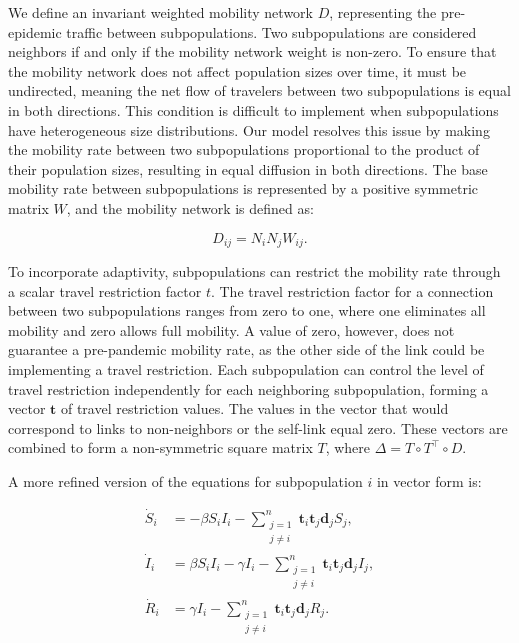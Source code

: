We define an invariant weighted mobility network \( D \), representing the pre-epidemic traffic between subpopulations. Two subpopulations are considered neighbors if and only if the mobility network weight is non-zero. To ensure that the mobility network does not affect population sizes over time, it must be undirected, meaning the net flow of travelers between two subpopulations is equal in both directions. This condition is difficult to implement when subpopulations have heterogeneous size distributions. Our model resolves this issue by making the mobility rate between two subpopulations proportional to the product of their population sizes, resulting in equal diffusion in both directions. The base mobility rate between subpopulations is represented by a positive symmetric matrix \( W \), and the mobility network is defined as:

\[
D_{ij} = N_i N_j W_{ij}.
\]

To incorporate adaptivity, subpopulations can restrict the mobility rate through a scalar travel restriction factor \(t\). The travel restriction factor for a connection between two subpopulations ranges from zero to one, where one eliminates all mobility and zero allows full mobility. A value of zero, however, does not guarantee a pre-pandemic mobility rate, as the other side of the link could be implementing a travel restriction. Each subpopulation can control the level of travel restriction independently for each neighboring subpopulation, forming a vector \( \mathbf{t} \) of travel restriction values. The values in the vector that would correspond to links to non-neighbors or the self-link equal zero. These vectors are combined to form a non-symmetric square matrix \( T \), where \( \Delta = T \circ T^\top \circ D \).

A more refined version of the equations for subpopulation \( i \) in vector form is:

\[
\begin{aligned}
    \dot{S}_{i} &= -\beta S_{i} I_{i} - \sum_{\substack{j=1 \\ j \neq i}}^n \mathbf{t}_i \mathbf{t}_j \mathbf{d}_j S_j, \\
    \dot{I}_{i} &= \beta S_{i} I_{i} - \gamma I_{i} - \sum_{\substack{j=1 \\ j \neq i}}^n \mathbf{t}_i \mathbf{t}_j \mathbf{d}_j I_j, \\
    \dot{R}_{i} &= \gamma I_{i} - \sum_{\substack{j=1 \\ j \neq i}}^n \mathbf{t}_i \mathbf{t}_j \mathbf{d}_j R_j.
\end{aligned}
\]

